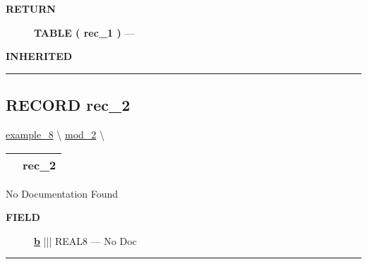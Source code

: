 \par
\begin{description}
\item [\colorbox{tagtype}{\color{white} \textbf{\textsf{RETURN}}}] \textbf{TABLE ( rec\_1 )} --- 
\end{description}






\par
\begin{description}
\item [\colorbox{tagtype}{\color{white} \textbf{\textsf{INHERITED}}}] 
\end{description}



\rule{\linewidth}{0.5pt}
\subsection*{\textsf{\colorbox{headtoc}{\color{white} RECORD}
rec\_2}}

\hypertarget{ecldoc:intest.example_8.mod_2.rec_2}{}
\hspace{0pt} \hyperlink{ecldoc:intest.example_8}{example_8} \textbackslash 
\hspace{0pt} \hyperlink{ecldoc:intest.example_8.mod_2}{mod_2} \textbackslash 

{\renewcommand{\arraystretch}{1.5}
\begin{tabularx}{\textwidth}{|>{\raggedright\arraybackslash}l|X|}
\hline
\hspace{0pt}\mytexttt{\color{red} } & \textbf{rec\_2} \\
\hline
\end{tabularx}
}

\par





No Documentation Found







\par
\begin{description}
\item [\colorbox{tagtype}{\color{white} \textbf{\textsf{FIELD}}}] \textbf{\underline{b}} ||| REAL8 --- No Doc
\end{description}





\rule{\linewidth}{0.5pt}
